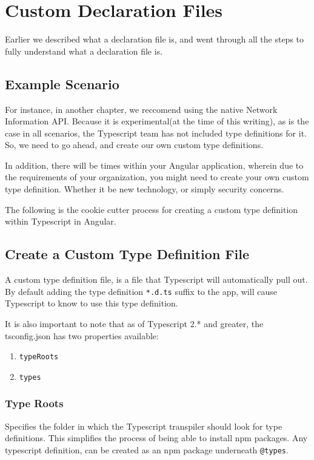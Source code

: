 \chapter{ Custom Declaration Files }
Earlier we described what a declaration file is, and went through all the steps to fully understand what a declaration file is.

\section{Example Scenario}
For instance, in another chapter, we reccomend using the native Network 
Information API. Because it is experimental(at the time of this writing),
as is the case in all scenarios, the Typescript team has not included 
type definitions for it. So, we need to go ahead, and create our own 
custom type definitions. 

In addition, there will be times within your Angular application, wherein 
due to the requirements of your organization, you might need to create your 
own custom type definition. Whether it be new technology, or simply security
concerns. 

The following is the cookie cutter process for creating a custom type 
definition within Typescript in Angular. 

\section{Create a Custom Type Definition File}
A custom type definition file, is a file that Typescript will automatically 
pull out. By default adding the type definition \lstinline{*.d.ts} suffix to
the app, will cause Typescript to know to use this type definition.

It is also important to note that as of Typescript 2.* and greater, the
tsconfig.json has two properties available: 
\begin{enumerate}
  \item \lstinline{typeRoots}
  \item \lstinline{types}
\end{enumerate}

\subsection{Type Roots}
Specifies the folder in which the Typescript transpiler should look for type 
definitions. This simplifies the process of being able to install npm packages.
Any typescript definition, can be created as an npm package underneath \lstinline{@types}.

